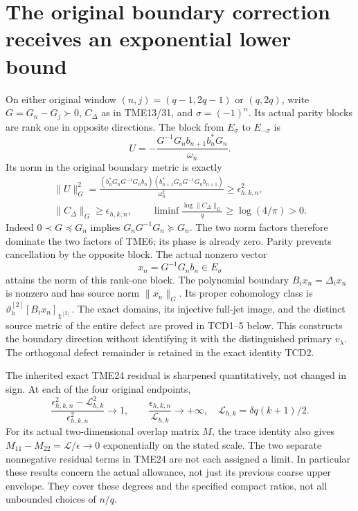 \documentclass[11pt,a4paper]{article}
\begin{document}
\section{The original boundary correction receives an exponential lower bound}

On either original window $(n,j)=(q-1,2q-1)$ or $(q,2q)$,
write $G=G_n-G_j\succ0$, $C_\Delta$ as in TME13/31, and
$\sigma=(-1)^n$. Its actual parity blocks are rank one in opposite
directions. The block from $E_\sigma$ to $E_{-\sigma}$ is
\[
 U=-\frac{G^{-1}G_nb_{n+1}b_n^*G_n}{\omega_n}.
\]
Its norm in the original boundary metric is exactly
\begin{equation}\tag{TCN29}\label{tcn:boundarybound}
 \boxed{\begin{gathered}
 \|U\|_G^2=
 \frac{(b_n^*G_nG^{-1}G_nb_n)
       (b_{n+1}^*G_nG^{-1}G_nb_{n+1})}{\omega_n^2}
 \ge\epsilon_{h,k,n}^2,\\
 \|C_\Delta\|_G\ge\epsilon_{h,k,n},\qquad
 \liminf\frac{\log\|C_\Delta\|_G}{q}\ge\log(4/\pi)>0.
 \end{gathered}}
\end{equation}
Indeed $0\prec G\preceq G_n$ implies $G_nG^{-1}G_n\succeq G_n$.
The two norm factors therefore dominate the two factors of TME6;
its phase is already zero. Parity prevents cancellation by the
opposite block. The actual nonzero vector
\begin{equation}\tag{TCN30}
 x_n=G^{-1}G_nb_n\in E_\sigma
\end{equation}
attains the norm of this rank-one block. The polynomial boundary
$B_ix_n=\Delta_i x_n$ is nonzero and has source norm $\|x_n\|_G$.
Its proper cohomology class is $\vartheta_h^{[2]}[B_ix_n]_{\chi^{[2]}}$.
The exact domains, its injective full-jet image, and the distinct
source metric of the entire defect are proved in TCD1--5 below.
This constructs the boundary direction without identifying it with
the distinguished primary $v_\lambda$. The orthogonal defect remainder
is retained in the exact identity TCD2.

The inherited exact TME24 residual is sharpened quantitatively, not
changed in sign. At each of the four original endpoints,
\begin{equation}\tag{TCN31}
 \boxed{\frac{\epsilon_{h,k,n}^2-\mathcal L_{h,k}^2}
                   {\epsilon_{h,k,n}^2}\longrightarrow1,
 \qquad
 \frac{\epsilon_{h,k,n}}{\mathcal L_{h,k}}\longrightarrow+\infty,\quad
 \mathcal L_{h,k}=\delta q(k+1)/2.}
\end{equation}
For its actual two-dimensional overlap matrix $M$, the trace identity
also gives $M_{11}-M_{22}=\mathcal L/\epsilon\to0$ exponentially on
the stated scale. The two separate nonnegative residual terms in
TME24 are not each assigned a limit. In particular these results
concern the actual allowance, not just its previous coarse upper
envelope. They cover these degrees and the specified compact ratios,
not all unbounded choices of $n/q$.
\end{document}
